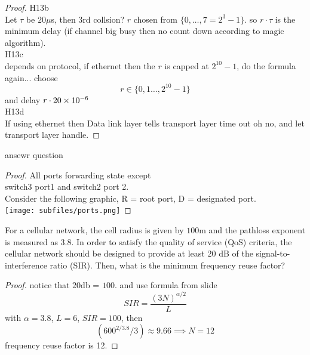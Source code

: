 \documentclass[../main.tex]{subfiles}
\begin{document}
\begin{proof}
H13b\\
Let $\tau$ be $20\mu$s, then $3$rd collsion? $r$ chosen from $\{0,\ldots,7=2^{3}-1\}$. so $r\cdot\tau$ is the minimum delay (if channel big busy then no count down according to magic algorithm).\\

H13c\\
 depends on protocol, if ethernet then the $r$ is capped at $2^{10}-1$, do the formula again... choose \[r\in\{0,1\ldots,2^{10}-1\}\]
 and delay $r\cdot 20\times 10^{-6}$\\

H13d\\ If using ethernet then Data link layer tells transport layer time out oh no, and let transport layer handle.
\end{proof}\newpage
{}
\begin{wts}
ansewr question
\end{wts}
\begin{proof}
    All ports forwarding state except \\
    switch3 port1 and switch2 port 2.\\

    Consider the following graphic, R = root port, D = designated port.\\
    \texttt{[image: subfiles/ports.png]}
\end{proof}\newpage
{}
\begin{wts}
For a cellular network, the cell radius is given by $100$m and the pathloss exponent is measured as $3.8$. In order to satisfy the quality of service (QoS) criteria, the cellular network should be designed to provide at least $20$ dB of the signal-to-interference ratio (SIR). Then, what is the minimum frequency reuse factor?
\end{wts}
\begin{proof}   
    notice that $20$db = $100$. and use formula from slide\[SIR = \dfrac{(3N)^{\alpha/2}}{L}\]
    with $\alpha = 3.8$, $L = 6$, $SIR = 100$, then
    \[(600^{2/3.8}/3)\approx 9.66\implies N =12 \]
    frequency reuse factor is 12.
\end{proof}
\end{document}
